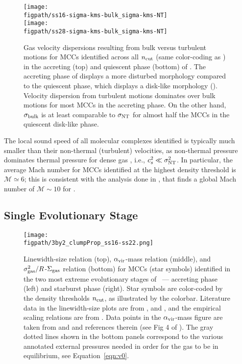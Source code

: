 \IfFileExists{emulateapjlegacy.cls}{\documentclass[iop]{emulateapjlegacy}}{\documentclass[iop]{emulateapj}}
\def\figpath{./Fig}
\begin{document}
\begin{figure}
\centering
\texttt{[image: \\figpath/ss16-sigma-kms-bulk\_sigma-kms-NT]} \\
\texttt{[image: \\figpath/ss28-sigma-kms-bulk\_sigma-kms-NT]}
\caption{Gas velocity dispersions resulting from bulk versus turbulent motions for MCCs identified across all $n_{\rm cut}$ (same color-coding as ) in the accreting (top) and quiescent phase (bottom) of \flower.
%
The accreting phase of \flower displays a more disturbed morphology compared to the quiescent phase, which displays a disk-like morphology ().
%
Velocity dispersion from turbulent motions dominates over bulk motions for most MCCs in the accreting phase. On the other hand, $\sigma_{\rm bulk}$ is at least comparable to $\sigma_{\rm NT}$ for almost half the MCCs in the quiescent disk-like phase.
\label{fig:vv}}
\vspace{0.5em}
\end{figure}

The local sound speed of all molecular complexes identified is typically much smaller than their non-thermal (turbulent) velocities,
as non-thermal pressure dominates thermal pressure for dense gas \citep{Pallottini17b}, i.e., $c_s^2 \ll \sigma_{\rm NT}^2$. In particular, the average Mach number for MCCs identified at the highest density threshold is $\mathcal{M} \simeq6$; this is consistent with the analysis done in \citep{Vallini18a}, that finds a global Mach number of $\mathcal{M} \sim 10$ for \flower.

\subsection{Single Evolutionary Stage}  \label{sec:singless}

\begin{figure*}
\centering
\texttt{[image: \\figpath/3by2\_clumpProp\_ss16-ss22.png]}
\caption{
Linewidth-size relation (top), $\alpha_{\rm vir}$-mass relation
(middle), and $\sigma_{\rm gas}^2/R$-$\Sigma_{\rm gas}$ relation (bottom) for
MCCs (star symbols) identified in the two most extreme evolutionary
stages of \flower\ --- accreting phase (left) and starburst phase
(right). Star symbols are color-coded by the density thresholds
$n_{\rm cut}$, as illustrated by the colorbar.
Literature data in the linewidth-size plots are from \citet{Heyer04a, Rosolowsky05a, Bolatto08a,
Leroy15a}, and \citet{Swinbank11a}, and the empirical scaling relations are
from \citet{Larson81a, Heyer04a, Bolatto08a}.
Data points in the $\alpha_{\rm vir}$-mass figure are taken from
\citet{Kauffmann17a} and \citet{Kauffmann17b} and references therein
(see Fig 4 of \citealt{Kauffmann17b}).
The gray dotted lines shown in the bottom panels correspond to the various annotated external pressures needed in order for
the gas to be in equilibrium, see Equation~\ref{eqn:v0}.
\label{fig:larsons_single}}
\end{figure*}
\end{document}
